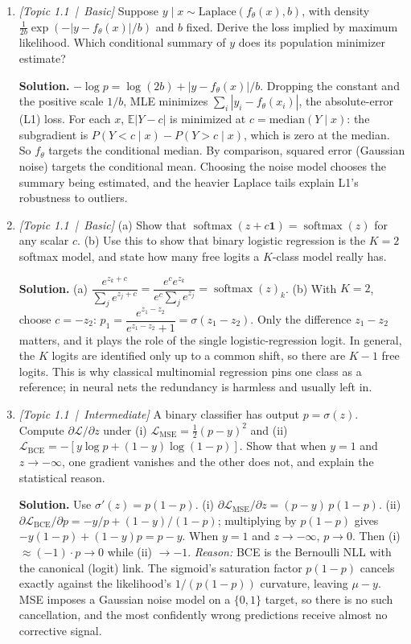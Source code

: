 \documentclass[11pt]{article}
\newcommand{\softmax}{\operatorname{softmax}}
\newcommand{\E}{\mathbb{E}}
\begin{document}
\begin{enumerate}[label=\textbf{Q\arabic*}, leftmargin=*]

  \item \textit{[Topic 1.1 \,|\, Basic]} Suppose $y\mid x \sim \mathrm{Laplace}(f_\theta(x), b)$, with density $\frac{1}{2b}\exp(-|y - f_\theta(x)|/b)$ and $b$ fixed. Derive the loss implied by maximum likelihood. Which conditional summary of $y$ does its population minimizer estimate?

  \textbf{Solution.} $-\log p = \log(2b) + |y - f_\theta(x)|/b$. Dropping the constant and the positive scale $1/b$, MLE minimizes $\sum_i |y_i - f_\theta(x_i)|$, the absolute-error (L1) loss. For each $x$, $\E|Y - c|$ is minimized at $c = \mathrm{median}(Y\mid x)$: the subgradient is $P(Y<c\mid x) - P(Y>c\mid x)$, which is zero at the median. So $f_\theta$ targets the conditional median. By comparison, squared error (Gaussian noise) targets the conditional mean. Choosing the noise model chooses the summary being estimated, and the heavier Laplace tails explain L1's robustness to outliers.

  \item \textit{[Topic 1.1 \,|\, Basic]} (a) Show that $\softmax(z + c\mathbf 1) = \softmax(z)$ for any scalar $c$. (b) Use this to show that binary logistic regression is the $K = 2$ softmax model, and state how many free logits a $K$-class model really has.

  \textbf{Solution.} (a) $\dfrac{e^{z_k + c}}{\sum_j e^{z_j + c}} = \dfrac{e^c e^{z_k}}{e^c\sum_j e^{z_j}} = \softmax(z)_k$.
  (b) With $K=2$, choose $c = -z_2$: $p_1 = \dfrac{e^{z_1 - z_2}}{e^{z_1 - z_2} + 1} = \sigma(z_1 - z_2)$. Only the difference $z_1 - z_2$ matters, and it plays the role of the single logistic-regression logit. In general, the $K$ logits are identified only up to a common shift, so there are $K-1$ free logits. This is why classical multinomial regression pins one class as a reference; in neural nets the redundancy is harmless and usually left in.

  \item \textit{[Topic 1.1 \,|\, Intermediate]} A binary classifier has output $p = \sigma(z)$. Compute $\partial\mathcal L/\partial z$ under (i) $\mathcal L_{\text{MSE}} = \tfrac12(p - y)^2$ and (ii) $\mathcal L_{\text{BCE}} = -[y\log p + (1-y)\log(1-p)]$. Show that when $y = 1$ and $z\to -\infty$, one gradient vanishes and the other does not, and explain the statistical reason.

  \textbf{Solution.} Use $\sigma'(z) = p(1-p)$. (i) $\partial\mathcal L_{\text{MSE}}/\partial z = (p - y)\,p(1-p)$. (ii) $\partial\mathcal L_{\text{BCE}}/\partial p = -y/p + (1-y)/(1-p)$; multiplying by $p(1-p)$ gives $-y(1-p) + (1-y)p = p - y$. When $y = 1$ and $z\to-\infty$, $p\to0$. Then (i) $\approx (-1)\cdot p \to 0$ while (ii) $\to -1$. \emph{Reason:} BCE is the Bernoulli NLL with the canonical (logit) link. The sigmoid's saturation factor $p(1-p)$ cancels exactly against the likelihood's $1/(p(1-p))$ curvature, leaving $\mu - y$. MSE imposes a Gaussian noise model on a $\{0,1\}$ target, so there is no such cancellation, and the most confidently wrong predictions receive almost no corrective signal.


\end{enumerate}
\end{document}
